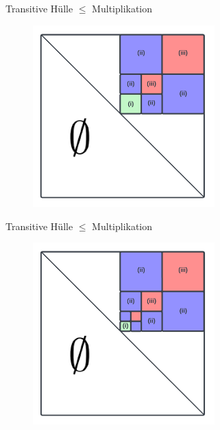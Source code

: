 \documentclass{beamer}
\begin{document}
	\begin{frame}{Transitive Hülle $\le$ Multiplikation}
		\begin{figure}
			\centering
			\includegraphics[width=7cm,height=7cm]{img/LGV12}
		\end{figure}
	\end{frame}

	\begin{frame}{Transitive Hülle $\le$ Multiplikation}
		\begin{figure}
			\centering
			\includegraphics[width=7cm,height=7cm]{img/LGV13}
		\end{figure}
	\end{frame}
\end{document}
